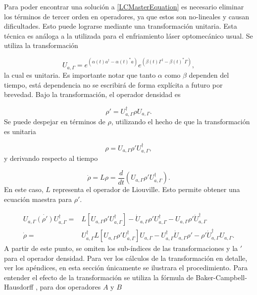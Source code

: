 \documentclass[a4paper,10pt]{report}
\begin{document}
Para poder encontrar una solución a \eqref{LCMasterEquation} es necesario eliminar los términos de tercer orden en operadores, ya que estos son no-lineales y causan dificultades. Esto puede lograrse mediante una transformación unitaria. Esta técnica es análoga a la utilizada para el enfriamiento láser optomecánico usual. Se utiliza la transformación

\begin{equation}
U_{a,\Gamma} = e^{(\alpha(t) a^\dagger - \alpha(t)^*a)}e^{(\beta(t) \Gamma^\dagger - \beta(t)^*\Gamma)},
\end{equation}la cual es unitaria. Es importante notar que tanto $\alpha$ como $\beta$ dependen del tiempo, está dependencia no se escribirá de forma explícita a futuro por brevedad. Bajo la transformación, el operador densidad es

\begin{equation}
\rho' = U_{a,\Gamma}^\dagger \rho U_{a,\Gamma}.
\end{equation} Se puede despejar en términos de $\rho$, utilizando el hecho de que la transformación es unitaria

\begin{equation}
\rho = U_{a,\Gamma} \rho' U_{a,\Gamma}^\dagger,
\end{equation}y derivando respecto al tiempo

\begin{equation}
\dot{\rho} = L\rho = \frac{d}{dt}(U_{a,\Gamma} \rho' U_{a,\Gamma}^\dagger).
\end{equation} En este caso, $L$ representa el operador de Liouville. Esto permite obtener una ecuación maestra para $\rho'$. 

\begin{align}
 U_{a,\Gamma} \dot{(\rho')} U_{a,\Gamma}^\dagger =& L[U_{a,\Gamma} \rho' U_{a,\Gamma}^\dagger] - \dot{U}_{a,\Gamma}\rho'U_{a,\Gamma}^\dagger -U_{a,\Gamma} \rho' \dot{U}_{a,\Gamma}^\dagger\\
\dot{\rho} =& U_{a,\Gamma}^\dagger L[U_{a,\Gamma} \rho' U_{a,\Gamma}^\dagger]U_{a,\Gamma}-U_{a,\Gamma}^\dagger\dot{U}_{a,\Gamma}\rho'-\rho'\dot{U}_{a,\Gamma}^\dagger U_{a,\Gamma}.
\end{align}A partir de este punto, se omiten los sub-índices de las transformaciones y la $'$ para el operador densidad. Para ver los cálculos de la transformación en detalle, ver los apéndices, en esta sección únicamente se ilustrara el procedimiento. Para entender el efecto de la transformación se utiliza la fórmula de Baker-Campbell-Hausdorff \cite{SakuraiQM}, para dos operadores $A$ y $B$
\end{document}
